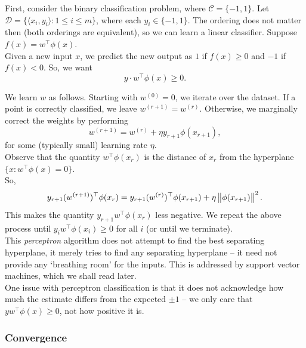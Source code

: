 \documentclass{article}
\begin{document}
			First, consider the binary classification problem, where $\mathcal{C} = \{-1,1\}$. Let $\mathcal{D} = \{ \langle x_i , y_i \rangle : 1 \le i \le m \}$, where each $y_i \in \{-1,1\}$. The ordering does not matter then (both orderings are equivalent), so we can learn a linear classifier. Suppose $f(x) = w^\top \phi(x)$.\\
			Given a new input $x$, we predict the new output as $1$ if $f(x) \ge 0$ and $-1$ if $f(x) < 0$. So, we want
			\[ y\cdot w^\top \phi(x) \ge 0. \]

			We learn $w$ as follows. Starting with $w^{(0)} = 0$, we iterate over the dataset. If a point is correctly classified, we leave $w^{(r+1)} = w^{(r)}$. Otherwise, we marginally correct the weights by performing
			\[ w^{(r+1)} = w^{(r)} + \eta y_{r+1}\phi(x_{r+1}), \]
			for some (typically small) learning rate $\eta$.\\
			Observe that the quantity $w^\top \phi(x_r)$ is the distance of $x_r$ from the hyperplane $\{x : w^\top\phi(x) = 0\}$.\\
			So,
			\[ y_{r+1}(w^{(r+1)})^\top \phi(x_r) = y_{r+1} (w^{(r)})^\top\phi(x_{r+1}) + \eta\left\lVert\phi(x_{r+1})\right\rVert^2. \]
			This makes the quantity $y_{r+1} w^\top \phi(x_r)$ less negative. We repeat the above process until $y_iw^\top\phi(x_i) \ge 0$ for all $i$ (or until we terminate). \\
			This \emph{perceptron} algorithm does not attempt to find the best separating hyperplane, it merely tries to find any separating hyperplane -- it need not provide any `breathing room' for the inputs. This is addressed by support vector machines, which we shall read later.\\
			One issue with perceptron classification is that it does not acknowledge how much the estimate differs from the expected $\pm 1$ -- we only care that $yw^\top\phi(x) \ge 0$, not how positive it is.

		\subsubsection{Convergence}
\end{document}
